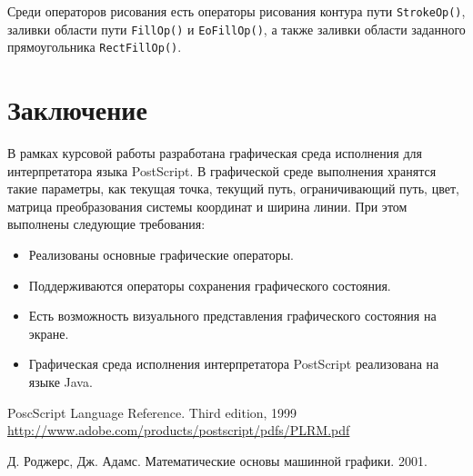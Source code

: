 \documentclass[14pt]{extarticle}
\begin{document}
Среди операторов рисования есть операторы рисования контура пути \texttt{StrokeOp()}, заливки области пути \texttt{FillOp()} и \texttt{EoFillOp()}, а также заливки области заданного прямоугольника \texttt{RectFillOp()}. 

\pagebreak

\section*{Заключение}

В рамках курсовой работы разработана графическая среда исполнения для интерпретатора языка PostScript. В графической среде выполнения хранятся такие параметры, как текущая точка, текущий путь, ограничивающий путь,  цвет,  матрица преобразования системы координат и ширина линии. 
При этом выполнены следующие требования:
\begin{itemize}
\item Реализованы основные графические операторы.
\item Поддерживаются операторы сохранения графического состояния.
\item Есть возможность визуального представления графического состояния на 
    экране.
\item Графическая среда исполнения интерпретатора PostScript реализована на языке Java.
\end{itemize}


%

\begin{thebibliography}{}
PoscScript Language Reference. Third edition, 1999
\\
\url{http://www.adobe.com/products/postscript/pdfs/PLRM.pdf}

Д. Роджерс, Дж. Адамс. Математические основы машинной графики. 2001. 

\end{thebibliography}
\end{document}
